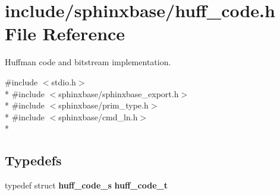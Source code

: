 \section{include/sphinxbase/huff\-\_\-code.h File Reference}
\label{huff__code_8h}


Huffman code and bitstream implementation.  


{\ttfamily \#include $<$stdio.\-h$>$}\\*
{\ttfamily \#include $<$sphinxbase/sphinxbase\-\_\-export.\-h$>$}\\*
{\ttfamily \#include $<$sphinxbase/prim\-\_\-type.\-h$>$}\\*
{\ttfamily \#include $<$sphinxbase/cmd\-\_\-ln.\-h$>$}\\*
\subsection*{Typedefs}
\begin{DoxyCompactItemize}
\item 
typedef struct {\bf huff\-\_\-code\-\_\-s} {\bfseries huff\-\_\-code\-\_\-t}\label{huff__code_8h_a99a5188e6a18682c96100cd5232af0f4}

\end{DoxyCompactItemize}
